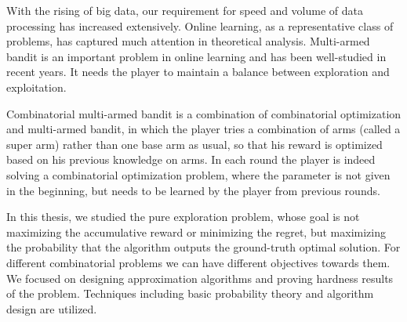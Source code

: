 \begin{eabstract}
With the rising of big data, our requirement for speed and volume of data processing has increased extensively. Online learning, as a representative class of problems, has captured much attention in theoretical analysis. Multi-armed bandit is an important problem in online learning and has been well-studied in recent years. It needs the player to maintain a balance between exploration and exploitation.

Combinatorial multi-armed bandit is a combination of combinatorial optimization and multi-armed bandit, in which the player tries a combination of arms (called a super arm) rather than one base arm as usual, so that his reward is optimized based on his previous knowledge on arms. In each round the player is indeed solving a combinatorial optimization problem, where the parameter is not given in the beginning, but needs to be learned by the player from previous rounds.


In this thesis, we studied the pure exploration problem, whose goal is not maximizing the accumulative reward or minimizing the regret, but maximizing the probability that the algorithm outputs the ground-truth optimal solution. For different combinatorial problems we can have different objectives towards them. We focused on designing approximation algorithms and proving hardness results of the problem. Techniques including basic probability theory and algorithm design are utilized.
\end{eabstract}


